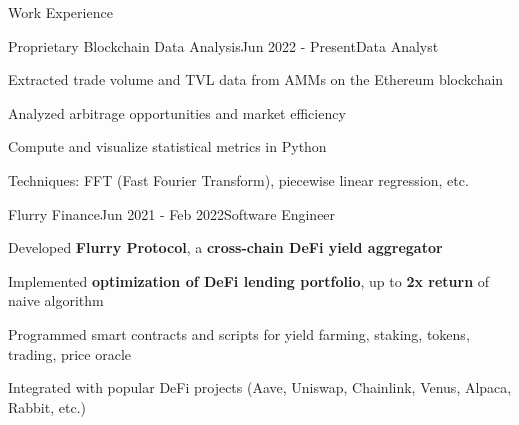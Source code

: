 \documentclass{resume}
\begin{document}
\begin{rSection}{Work Experience}
    
    \begin{rSubsection}{Proprietary Blockchain Data Analysis}{Jun 2022 - Present}{Data Analyst}{}
        \item Extracted trade volume and TVL data from AMMs on the Ethereum blockchain
        \item Analyzed arbitrage opportunities and market efficiency
        \item Compute and visualize statistical metrics in Python
        \item Techniques: FFT (Fast Fourier Transform), piecewise linear regression, etc.
    \end{rSubsection}
    
    \begin{rSubsection}{Flurry Finance}{Jun 2021 - Feb 2022}{Software Engineer}{}
        \item Developed \textbf{Flurry Protocol}, a \textbf{cross-chain DeFi yield aggregator}
        \item Implemented \textbf{optimization of DeFi lending portfolio}, up to \textbf{2x return} of naive algorithm
        \item Programmed smart contracts and scripts for yield farming, staking, tokens, trading, price oracle
        \item Integrated with popular DeFi projects (Aave, Uniswap, Chainlink, Venus, Alpaca, Rabbit, etc.)
    \end{rSubsection}
    
\end{rSection}
\end{document}
